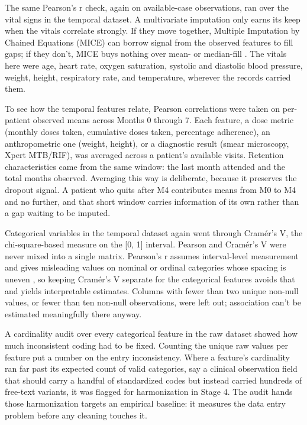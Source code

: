 \documentclass[12pt]{article}
\renewcommand{\_}{\textunderscore\allowbreak}
\begin{document}
The same Pearson's r check, again on available-case observations, ran over the vital signs in the temporal dataset. A multivariate imputation only earns its keep when the vitals correlate strongly. If they move together, Multiple Imputation by Chained Equations (MICE) can borrow signal from the observed features to fill gaps; if they don't, MICE buys nothing over mean- or median-fill \citep{ref35}. The vitals here were age, heart rate, oxygen saturation, systolic and diastolic blood pressure, weight, height, respiratory rate, and temperature, wherever the records carried them.

To see how the temporal features relate, Pearson correlations were taken on per-patient observed means across Months 0 through 7. Each feature, a dose metric (monthly doses taken, cumulative doses taken, percentage adherence), an anthropometric one (weight, height), or a diagnostic result (smear microscopy, Xpert MTB/RIF), was averaged across a patient's available visits. Retention characteristics came from the same window: the last month attended and the total months observed. Averaging this way is deliberate, because it preserves the dropout signal. A patient who quits after M4 contributes means from M0 to M4 and no further, and that short window carries information of its own rather than a gap waiting to be imputed.

Categorical variables in the temporal dataset again went through Cram\'{e}r's V, the chi-square-based measure on the [0, 1] interval. Pearson and Cram\'{e}r's V were never mixed into a single matrix. Pearson's r assumes interval-level measurement and gives misleading values on nominal or ordinal categories whose spacing is uneven \citep{ref27}, so keeping Cram\'{e}r's V separate for the categorical features avoids that and yields interpretable estimates. Columns with fewer than two unique non-null values, or fewer than ten non-null observations, were left out; association can't be estimated meaningfully there anyway.

A cardinality audit over every categorical feature in the raw dataset showed how much inconsistent coding had to be fixed. Counting the unique raw values per feature put a number on the entry inconsistency. Where a feature's cardinality ran far past its expected count of valid categories, say a clinical observation field that should carry a handful of standardized codes but instead carried hundreds of free-text variants, it was flagged for harmonization in Stage 4. The audit hands those harmonization targets an empirical baseline: it measures the data entry problem before any cleaning touches it.
\end{document}
